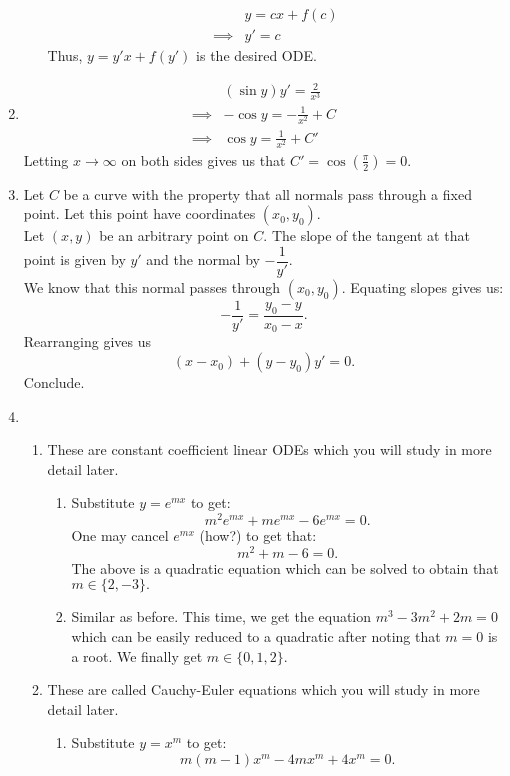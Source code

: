 \documentclass[12pt]{article}
\begin{document}
\begin{enumerate}[label = Q.\arabic*.]
\begin{enumerate}[label = (\roman*)]
		\begin{align*} 
			& y = cx + f(c)\\
			\implies & y' = c
		\end{align*}
		Thus, $y = y'x + f(y')$ is the desired ODE.
	\end{enumerate}
	\item 
	\begin{align*} 
		& (\sin y)y' = \frac{2}{x^3}\\
		\implies & -\cos y = -\frac{1}{x^2} + C\\
		\implies & \cos y = \frac{1}{x^2} + C'
	\end{align*}
	Letting $x \to \infty$ on both sides gives us that $C' = \cos\left(\frac{\pi}{2}\right) = 0.$
	\item Let $C$ be a curve with the property that all normals pass through a fixed point. Let this point have coordinates $(x_0, y_0).$\\
	Let $(x, y)$ be an arbitrary point on $C.$ The slope of the tangent at that point is given by $y'$ and the normal by $-\dfrac{1}{y'}.$\\
	We know that this normal passes through $(x_0, y_0).$ Equating slopes gives us:
	\[-\dfrac{1}{y'} = \dfrac{y_0 - y}{x_0 - x}.\]
	Rearranging gives us
	\[(x - x_0) + (y - y_0)y' = 0.\]
	Conclude.
	\item 
	\begin{enumerate}[label = (\alph*)] 
		\item These are constant coefficient linear ODEs which you will study in more detail later.
		\begin{enumerate}[label = (\roman*)] 
			\item Substitute $y = e^{mx}$ to get:
			\[m^2e^{mx} + me^{mx} - 6e^{mx} = 0.\]
			One may cancel $e^{mx}$ (how?) to get that:
			\[m^2 + m - 6 = 0.\]
			The above is a quadratic equation which can be solved to obtain that $m \in \{2, -3\}.$
			\item Similar as before. This time, we get the equation $m^3 - 3m^2 + 2m = 0$ which can be easily reduced to a quadratic after noting that $m = 0$ is a root. We finally get $m \in \{0, 1, 2\}.$
		\end{enumerate}	
		\item These are called Cauchy-Euler equations which you will study in more detail later.
		\begin{enumerate}[label = (\roman*)] 
			\item Substitute $y = x^m$ to get:
			\[m(m - 1)x^{m} - 4mx^{m} + 4x^{m} = 0.\]

\end{enumerate}
\end{enumerate}
\end{enumerate}
\end{document}
